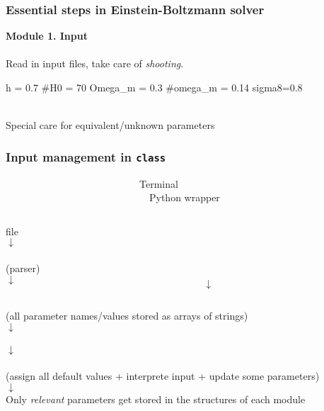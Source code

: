\begin{frame}[fragile]
	\frametitle{Essential steps in Einstein-Boltzmann solver}
	
	{\bf Module 1. Input}\\
	\mbox{}\\
	Read in input files, take care of \textit{shooting}.
	
	\begin{class}
h = 0.7
#H0 = 70
Omega_m = 0.3
#omega_m = 0.14
sigma8=0.8
	\end{class}
	
	\mbox{}\\
	Special care for equivalent/unknown parameters
	
\end{frame}

\begin{frame}[fragile]
	\frametitle{Input management in {\tt \Red class}}
	
	\begin{block}{~~~~~~~~~~~~~~~~~~~~~~~~~~~Terminal~~~~~~~~~~~~~~~~~~~~~~~~~~~~~~~~~~~~~~~~~~~~~~~~~~~~~~~~~~~~~~~~~~Python wrapper}
		\begin{columns}
			\begin{column}{0.5\textwidth} 
				\begin{center}
					file \\
					$\downarrow$\\
					\\
					(parser)\\
					$\downarrow$\\
				\end{center}
			\end{column}
			\begin{column}{0.5\textwidth} 
				\begin{center}
					\mbox{ }\\
					\mbox{ }\\
					\mbox{ }\\
					\\
					$\downarrow$\\
				\end{center}
			\end{column}
		\end{columns}
		\vspace{-0.3cm}
		\begin{center}
			 (all parameter names/values stored as arrays of strings)\\
			$\downarrow$\\
			\\
			$\downarrow$\\
			\\
			(assign all default values + interprete input + update some parameters)\\
			$\downarrow$\\
			Only {\it relevant} parameters get stored in the structures of each module
		\end{center}
	\end{block}
\end{frame}

